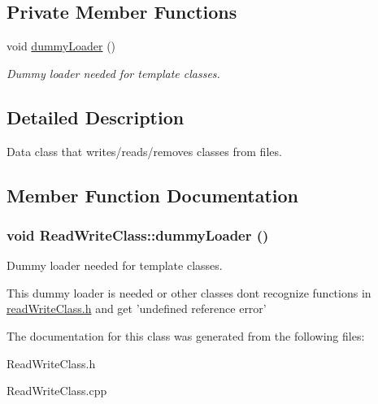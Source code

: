 \subsection*{Private Member Functions}
\begin{CompactItemize}
\item 
void \hyperlink{class_read_write_class_a73e0ba1f66bb2de1f0f36586b54afc7}{dummy\-Loader} ()
\begin{CompactList}\small\item\em Dummy loader needed for template classes. \item\end{CompactList}\end{CompactItemize}


\subsection{Detailed Description}
Data class that writes/reads/removes classes from files. 



\subsection{Member Function Documentation}
\hypertarget{class_read_write_class_a73e0ba1f66bb2de1f0f36586b54afc7}{
\subsubsection[dummyLoader]{\setlength{\rightskip}{0pt plus 5cm}void Read\-Write\-Class::dummy\-Loader ()}}
\label{class_read_write_class_a73e0ba1f66bb2de1f0f36586b54afc7}


Dummy loader needed for template classes. 

This dummy loader is needed or other classes dont recognize functions in \hyperlink{_read_write_class_8h-source}{read\-Write\-Class.h} and get 'undefined reference error' 

The documentation for this class was generated from the following files:\begin{CompactItemize}
\item 
Read\-Write\-Class.h\item 
Read\-Write\-Class.cpp\end{CompactItemize}
